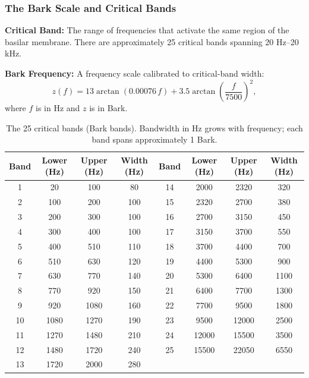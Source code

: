 \subsubsection{The Bark Scale and Critical Bands}
\label{sec:bark}

\begin{definitionbox}
\textbf{Critical Band:} The range of frequencies that activate the same region of the basilar membrane. There are approximately 25 critical bands spanning 20 Hz--20 kHz.

\textbf{Bark Frequency:} A frequency scale calibrated to critical-band width:
\begin{equation}
z(f) = 13\arctan\!\left(0.00076\,f\right) + 3.5\arctan\!\left(\frac{f}{7500}\right)^2,
\label{eq:bark}
\end{equation}
where $f$ is in Hz and $z$ is in Bark.
\end{definitionbox}

\begin{table}[H]
\centering
\caption{The 25 critical bands (Bark bands). Bandwidth in Hz grows with frequency; each band spans approximately 1 Bark.}
\label{tab:bark}
\setlength{\tabcolsep}{8pt}
\begin{tabular}{cccc|cccc}
\toprule
Band & Lower (Hz) & Upper (Hz) & Width (Hz) &
Band & Lower (Hz) & Upper (Hz) & Width (Hz) \\
\midrule
1  &    20 &   100 &   80  & 14 & 2000 & 2320 &  320 \\
2  &   100 &   200 &  100  & 15 & 2320 & 2700 &  380 \\
3  &   200 &   300 &  100  & 16 & 2700 & 3150 &  450 \\
4  &   300 &   400 &  100  & 17 & 3150 & 3700 &  550 \\
5  &   400 &   510 &  110  & 18 & 3700 & 4400 &  700 \\
6  &   510 &   630 &  120  & 19 & 4400 & 5300 &  900 \\
7  &   630 &   770 &  140  & 20 & 5300 & 6400 & 1100 \\
8  &   770 &   920 &  150  & 21 & 6400 & 7700 & 1300 \\
9  &   920 &  1080 &  160  & 22 & 7700 & 9500 & 1800 \\
10 &  1080 &  1270 &  190  & 23 & 9500 &12000 & 2500 \\
11 &  1270 &  1480 &  210  & 24 &12000 &15500 & 3500 \\
12 &  1480 &  1720 &  240  & 25 &15500 &22050 & 6550 \\
13 &  1720 &  2000 &  280  &    &      &      &      \\
\bottomrule
\end{tabular}
\end{table}

